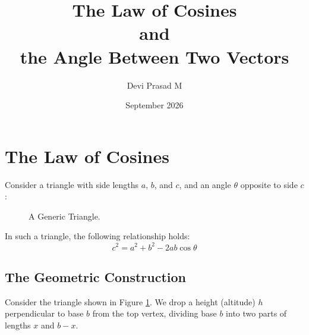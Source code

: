 \documentclass[12pt]{article}
\title{The Law of Cosines \vspace*{2pt}\\ and \vspace*{2pt}\\ the Angle Between Two Vectors}
\author{Devi Prasad M}
\date{September 2026}
\begin{document}
\pagecolor{yellow!25!brown!30}

\maketitle


\section{The Law of Cosines}
Consider a triangle with side lengths $a$, $b$, and $c$, and
an angle $\theta$ opposite to side $c$:

\begin{figure}[h]
\centering
{}
\caption{A Generic Triangle.}
\label{fig:triangle_diagram}
\end{figure}

\noindent In such a triangle, the following relationship holds:
\begin{equation}
c^2 = a^2 + b^2 - 2ab \cos\theta
\end{equation}

\subsection{The Geometric Construction}

Consider the triangle shown in Figure \ref{fig:triangle_diagram}.
We drop a height (altitude) $h$ perpendicular to base $b$
from the top vertex, dividing base $b$ into two parts of lengths
$x$ and $b - x$.
\end{document}
